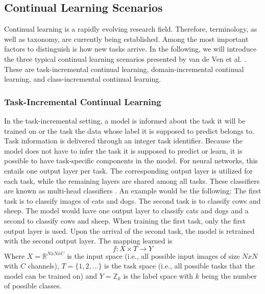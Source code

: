 \subsection{Continual Learning Scenarios}
\label{sec:ContinualLearningScenarios}
Continual learning is a rapidly evolving research field. Therefore, terminology, as well as taxonomy, are currently being established. Among the most
important factors to distinguish is how new tasks arrive. In the following, we will introduce the three typical continual learning scenarios
presented by van de Ven et al. \cite{van2022three}. These are task-incremental continual learning, domain-incremental continual learning, and
class-incremental continual learning.

\subsubsection{Task-Incremental Continual Learning}
\label{sec:TaskIncrementalContinualLearning}
In the task-incremental setting, a model is informed about the task it will be trained on or the task the data whose label it is supposed to predict belongs to.
Task information is delivered through an integer task identifier. Because the model does not have to infer the task it is supposed to predict
or learn, it is possible to have task-specific components in the model. For neural networks, this entails one output layer per task. The corresponding
output layer is utilized for each task, while the remaining layers are shared among all tasks. These classifiers are known as multi-head classifiers
\cite{vandeven2019generative}. An example would be the following: The first task is to classify images of cats and dogs. The second task is to classify cows and sheep.
The model would have one output layer to classify cats and dogs and a second to classify cows and sheep. When training the first task, only the first output layer
is used. Upon the arrival of the second task, the model is retrained with the second output layer. The mapping learned is 
\begin{equation}
    f: X \times T \rightarrow Y
\end{equation}
Where $X = \mathbb{R}^{N x N x C}$ is the input space (i.e., all possible input images of size $N x N$ with $C$ channels), $T = \{1,2,\ldots\}$ is the task space (i.e., all possible
tasks that the model can be trained on) and $Y = \mathbb{Z}_{k}$ is the label space with $k$ being the number of possible classes.


